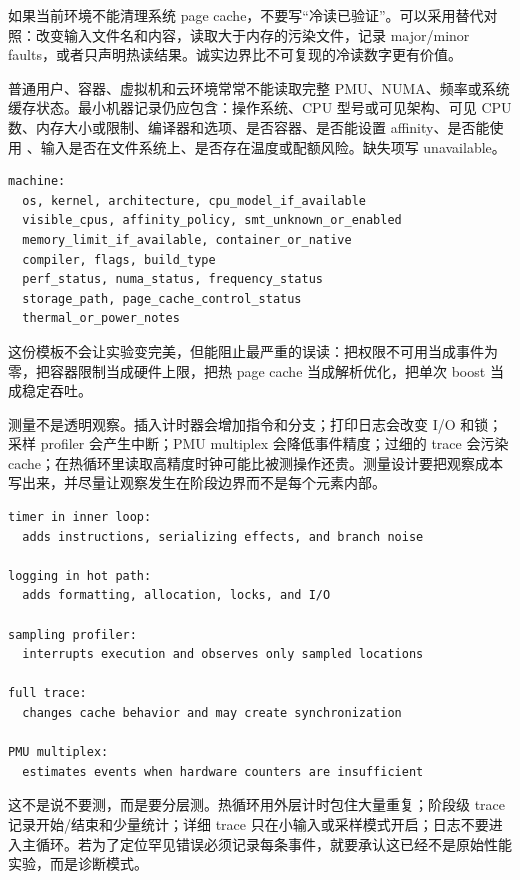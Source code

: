如果当前环境不能清理系统 page cache，不要写“冷读已验证”。可以采用替代对照：改变输入文件名和内容，读取大于内存的污染文件，记录 major/minor faults，或者只声明热读结果。诚实边界比不可复现的冷读数字更有价值。

普通用户、容器、虚拟机和云环境常常不能读取完整 PMU、NUMA、频率或系统缓存状态。最小机器记录仍应包含：操作系统、CPU 型号或可见架构、可见 CPU 数、内存大小或限制、编译器和选项、是否容器、是否能设置 affinity、是否能使用 、输入是否在文件系统上、是否存在温度或配额风险。缺失项写 unavailable。

\begin{lstlisting}[numbers=none,caption={受限环境的机器记录模板}]
machine:
  os, kernel, architecture, cpu_model_if_available
  visible_cpus, affinity_policy, smt_unknown_or_enabled
  memory_limit_if_available, container_or_native
  compiler, flags, build_type
  perf_status, numa_status, frequency_status
  storage_path, page_cache_control_status
  thermal_or_power_notes
\end{lstlisting}

这份模板不会让实验变完美，但能阻止最严重的误读：把权限不可用当成事件为零，把容器限制当成硬件上限，把热 page cache 当成解析优化，把单次 boost 当成稳定吞吐。

测量不是透明观察。插入计时器会增加指令和分支；打印日志会改变 I/O 和锁；采样 profiler 会产生中断；PMU multiplex 会降低事件精度；过细的 trace 会污染 cache；在热循环里读取高精度时钟可能比被测操作还贵。测量设计要把观察成本写出来，并尽量让观察发生在阶段边界而不是每个元素内部。

\begin{lstlisting}[numbers=none,caption={测量扰动的常见来源}]
timer in inner loop:
  adds instructions, serializing effects, and branch noise

logging in hot path:
  adds formatting, allocation, locks, and I/O

sampling profiler:
  interrupts execution and observes only sampled locations

full trace:
  changes cache behavior and may create synchronization

PMU multiplex:
  estimates events when hardware counters are insufficient
\end{lstlisting}

这不是说不要测，而是要分层测。热循环用外层计时包住大量重复；阶段级 trace 记录开始/结束和少量统计；详细 trace 只在小输入或采样模式开启；日志不要进入主循环。若为了定位罕见错误必须记录每条事件，就要承认这已经不是原始性能实验，而是诊断模式。

